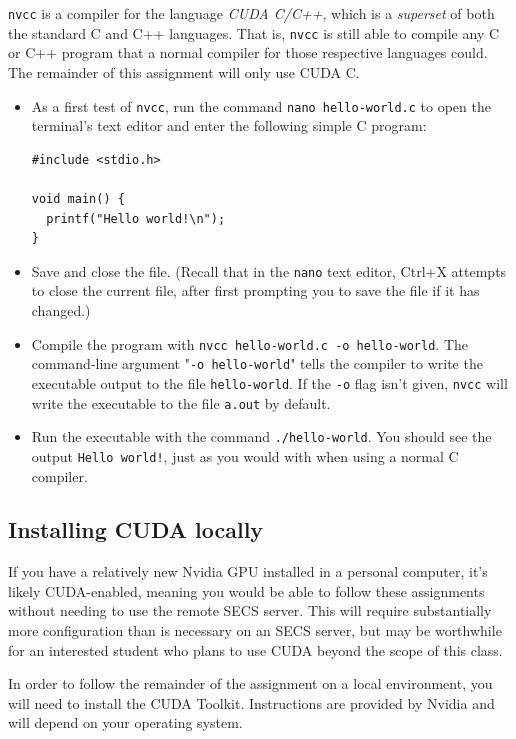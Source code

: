 \documentclass{article}
\theoremstyle{definition}
\begin{document}
\texttt{nvcc} is a compiler for the language \emph{CUDA C/C++}, which is a \emph{superset} of both the standard C and C++ languages. That is, \texttt{nvcc} is still able to compile any C or C++ program that a normal compiler for those respective languages could. The remainder of this assignment will only use CUDA C.

\begin{itemize}
\item
As a first test of \texttt{nvcc}, run the command \texttt{nano hello-world.c} to open the terminal's text editor and enter the following simple C program:

\begin{verbatim}
#include <stdio.h>

void main() {
  printf("Hello world!\n");
}
\end{verbatim}

\item
Save and close the file. (Recall that in the \texttt{nano} text editor, Ctrl+X attempts to close the current file, after first prompting you to save the file if it has changed.)

\item
Compile the program with \texttt{nvcc hello-world.c -o hello-world}. The command-line argument "\texttt{-o hello-world}" tells the compiler to write the executable output to the file \texttt{hello-world}. If the \texttt{-o} flag isn't given, \texttt{nvcc} will write the executable to the file \texttt{a.out} by default.

\item
Run the executable with the command \texttt{./hello-world}. You should see the output \texttt{Hello world!}, just as you would with when using a normal C compiler.
\end{itemize}

\subsection{Installing CUDA locally}
If you have a relatively new Nvidia GPU installed in a personal computer, it's likely CUDA-enabled, meaning you would be able to follow these assignments without needing to use the remote SECS server. This will require substantially more configuration than is necessary on an SECS server, but may be worthwhile for an interested student who plans to use CUDA beyond the scope of this class.

In order to follow the remainder of the assignment on a local environment, you will need to install the CUDA Toolkit. Instructions are provided by Nvidia and will depend on your operating system.
\end{document}
